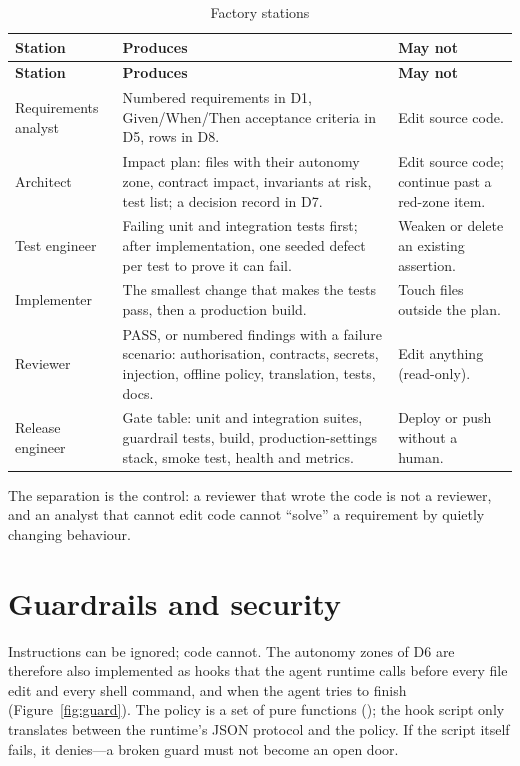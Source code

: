 \documentclass[../main.tex]{subfiles}
\begin{document}
\begin{longtable}{|p{2.6cm}|p{6.4cm}|p{4.9cm}|}
\caption{Factory stations}\label{tab:stations}\\
\hline
\textbf{Station} & \textbf{Produces} & \textbf{May not} \\ \hline
\endfirsthead
\hline
\textbf{Station} & \textbf{Produces} & \textbf{May not} \\ \hline
\endhead
Requirements analyst & Numbered requirements in D1, Given/When/Then acceptance criteria in D5, rows in D8. & Edit source code. \\ \hline
Architect & Impact plan: files with their autonomy zone, contract impact, invariants at risk, test list; a decision record in D7. & Edit source code; continue past a red-zone item. \\ \hline
Test engineer & Failing unit and integration tests first; after implementation, one seeded defect per test to prove it can fail. & Weaken or delete an existing assertion. \\ \hline
Implementer & The smallest change that makes the tests pass, then a production build. & Touch files outside the plan. \\ \hline
Reviewer & PASS, or numbered findings with a failure scenario: authorisation, contracts, secrets, injection, offline policy, translation, tests, docs. & Edit anything (read-only). \\ \hline
Release engineer & Gate table: unit and integration suites, guardrail tests, build, production-settings stack, smoke test, health and metrics. & Deploy or push without a human. \\ \hline
\end{longtable}

The separation is the control: a reviewer that wrote the code is not a reviewer, and an analyst
that cannot edit code cannot ``solve'' a requirement by quietly changing behaviour.

\section{Guardrails and security}
Instructions can be ignored; code cannot. The autonomy zones of D6 are therefore also implemented
as hooks that the agent runtime calls before every file edit and every shell command, and when the
agent tries to finish (Figure~\ref{fig:guard}). The policy is a set of pure functions
(); the hook script only translates between the runtime's JSON
protocol and the policy. If the script itself fails, it denies---a broken guard must not become an
open door.
\end{document}
